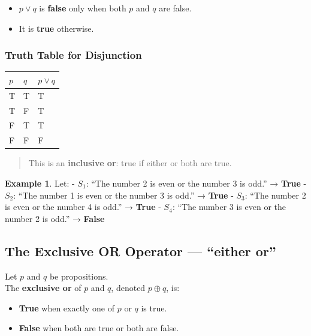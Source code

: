 \documentclass[
]{book}
\providecommand{\tightlist}{%
  \setlength{\itemsep}{0pt}\setlength{\parskip}{0pt}}
\theoremstyle{definition}
\theoremstyle{definition}
\newtheorem{example}{Example}[chapter]
\theoremstyle{definition}
\theoremstyle{definition}
\theoremstyle{remark}
\begin{document}
\begin{itemize}
\tightlist
\item
  \(p \lor q\) is \textbf{false} only when both \(p\) and \(q\) are false.
\item
  It is \textbf{true} otherwise.
\end{itemize}

\subsubsection{Truth Table for Disjunction}\label{truth-table-for-disjunction}

\begin{longtable}[]{@{}lll@{}}
\toprule\noalign{}
\(p\) & \(q\) & \(p \lor q\) \\
\midrule\noalign{}
\endhead
\bottomrule\noalign{}
\endlastfoot
T & T & T \\
T & F & T \\
F & T & T \\
F & F & F \\
\end{longtable}

\begin{quote}
This is an \textbf{inclusive or}: true if either or both are true.
\end{quote}

\begin{example}
\protect\hypertarget{exm:unnamed-chunk-18}{}\label{exm:unnamed-chunk-18}Let:
- \(S_1\): ``The number 2 is even or the number 3 is odd.'' → \textbf{True}
- \(S_2\): ``The number 1 is even or the number 3 is odd.'' → \textbf{True}
- \(S_3\): ``The number 2 is even or the number 4 is odd.'' → \textbf{True}
- \(S_4\): ``The number 3 is even or the number 2 is odd.'' → \textbf{False}
\end{example}

\subsection{The Exclusive OR Operator --- ``either or''}\label{the-exclusive-or-operator-either-or}

Let \(p\) and \(q\) be propositions.\\
The \textbf{exclusive or} of \(p\) and \(q\), denoted \(p \oplus q\), is:

\begin{itemize}
\tightlist
\item
  \textbf{True} when exactly one of \(p\) or \(q\) is true.
\item
  \textbf{False} when both are true or both are false.
\end{itemize}
\end{document}
